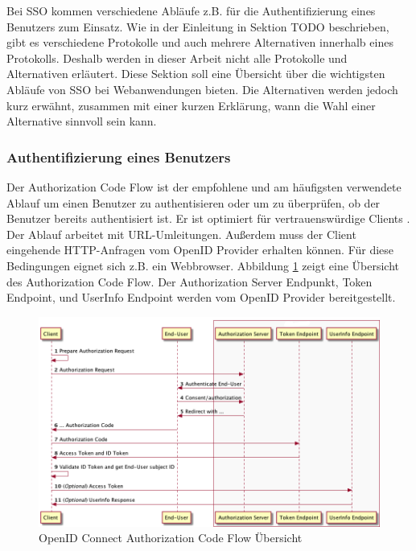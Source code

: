 Bei SSO kommen verschiedene Abläufe z.B. für die Authentifizierung eines Benutzers zum Einsatz. Wie in der Einleitung in Sektion TODO beschrieben, gibt es verschiedene Protokolle und auch mehrere Alternativen innerhalb eines Protokolls. Deshalb werden in dieser Arbeit nicht alle Protokolle und Alternativen erläutert. Diese Sektion soll eine Übersicht über die wichtigsten Abläufe von SSO bei Webanwendungen bieten. Die Alternativen werden jedoch kurz erwähnt, zusammen mit einer kurzen Erklärung, wann die Wahl einer Alternative sinnvoll sein kann.

\subsubsection{Authentifizierung eines Benutzers} \label{EB_Authentifizierung eines Benutzers}

Der Authorization Code Flow ist der empfohlene und am häufigsten verwendete Ablauf um einen Benutzer zu authentisieren oder um zu überprüfen, ob der Benutzer bereits authentisiert ist. Er ist optimiert für vertrauenswürdige Clients \cite{EB13}. Der Ablauf arbeitet mit URL-Umleitungen. Außerdem muss der Client eingehende HTTP-Anfragen vom OpenID Provider erhalten können. Für diese Bedingungen eignet sich z.B. ein Webbrowser. Abbildung \ref{fig:EB_AuthorizationCodeFlow} zeigt eine Übersicht des Authorization Code Flow. Der Authorization Server Endpunkt, Token Endpoint, und UserInfo Endpoint werden vom OpenID Provider bereitgestellt.


\begin{figure}[!ht]
	\centering
	\includegraphics[width=1\textwidth]{Images/Ebert/AuthorizationCodeFlow.png}
	\caption{OpenID Connect Authorization Code Flow Übersicht \cite{EB12}}
	\label{fig:EB_AuthorizationCodeFlow}
\end{figure} %

